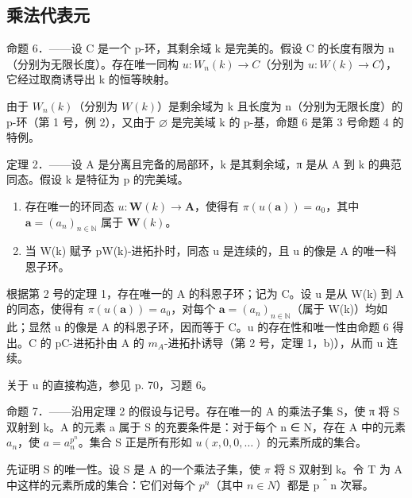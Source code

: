 \subsection{乘法代表元}

命题 6．——设 C 是一个 p-环，其剩余域 k 是完美的。假设 C 的长度有限为 n（分别为无限长度）。存在唯一同构 \(u:W_{n}(k)\to C\)（分别为 \(u:W(k)\to C\)），它经过取商诱导出 k 的恒等映射。

由于 \(W_{n}(k)\)（分别为 \(W(k)\)）是剩余域为 k 且长度为 n（分别为无限长度）的 p-环（第 1 号，例 2），又由于 \(\varnothing\) 是完美域 k 的 p-基，命题 6 是第 3 号命题 4 的特例。

定理 2．——设 A 是分离且完备的局部环，k 是其剩余域，π 是从 A 到 k 的典范同态。假设 k 是特征为 p 的完美域。

\begin{enumerate}
\def\labelenumi{\alph{enumi})}
\item
  存在唯一的环同态 \(u: \mathbf{W}(k) \to \mathbf{A}\)，使得有 \(\pi(u(\boldsymbol{a})) = a_0\)，其中 \(\boldsymbol{a} = (a_n)_{n \in \mathbb{N}}\) 属于 \(\mathbf{W}(k)\)。
\item
  当 W(k) 赋予 pW(k)-进拓扑时，同态 u 是连续的，且 u 的像是 A 的唯一科恩子环。
\end{enumerate}

根据第 2 号的定理 1，存在唯一的 A 的科恩子环；记为 C。设 u 是从 W(k) 到 A 的同态，使得有 \(\pi(u(\boldsymbol{a})) = a_0\)，对每个 \(\boldsymbol{a} = (a_n)_{n \in \mathbb{N}}\)（属于 W(k)）均如此；显然 u 的像是 A 的科恩子环，因而等于 C。u 的存在性和唯一性由命题 6 得出。C 的 pC-进拓扑由 A 的 \(m_{A}\)-进拓扑诱导（第 2 号，定理 1，b)），从而 u 连续。

关于 u 的直接构造，参见 p. 70，习题 6。

命题 7．——沿用定理 2 的假设与记号。存在唯一的 A 的乘法子集 S，使 π 将 S 双射到 k。A 的元素 a 属于 S 的充要条件是：对于每个 n ∈ N，存在 A 中的元素 \(a_{n}\)，使 \(a = a_{n}^{p^{n}}\)。集合 S 正是所有形如 \(u(x, 0, 0, \ldots)\) 的元素所成的集合。

先证明 S 的唯一性。设 S 是 A 的一个乘法子集，使 \(\pi\) 将 S 双射到 k。令 T 为 A 中这样的元素所成的集合：它们对每个 \(p^{n}\)（其中 \(n \in N\)）都是 p＾n 次幂。

